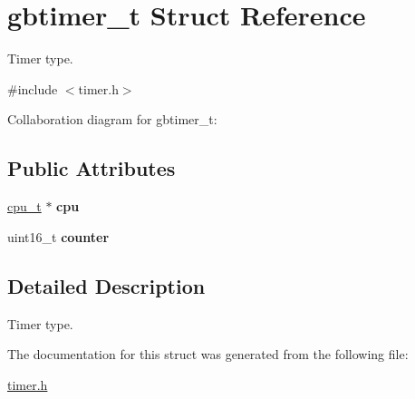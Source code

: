 \hypertarget{structgbtimer__t}{}\section{gbtimer\+\_\+t Struct Reference}
\label{structgbtimer__t}


Timer type.  




{\ttfamily \#include $<$timer.\+h$>$}



Collaboration diagram for gbtimer\+\_\+t\+:
\subsection*{Public Attributes}
\begin{DoxyCompactItemize}
\item 
\mbox{\label{structgbtimer__t_a5a6c4a92d67c6f2fb621f3f1b141c0ad}} 
\hyperlink{structcpu__t}{cpu\+\_\+t} $\ast$ {\bfseries cpu}
\item 
\mbox{\label{structgbtimer__t_a1e8ae48cc4a71deceb4d7b091b184825}} 
uint16\+\_\+t {\bfseries counter}
\end{DoxyCompactItemize}


\subsection{Detailed Description}
Timer type. 

The documentation for this struct was generated from the following file\+:\begin{DoxyCompactItemize}
\item 
\hyperlink{timer_8h}{timer.\+h}\end{DoxyCompactItemize}
